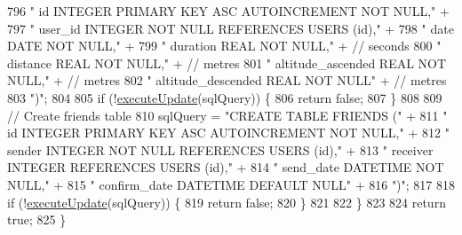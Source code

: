 \begin{DoxyCode}
796                     \textcolor{stringliteral}{"    id                  INTEGER PRIMARY KEY ASC AUTOINCREMENT NOT NULL,"} +
797                     \textcolor{stringliteral}{"    user\_id             INTEGER NOT NULL REFERENCES USERS (id),"} +
798                     \textcolor{stringliteral}{"    date                DATE    NOT NULL,"} +
799                     \textcolor{stringliteral}{"    duration            REAL    NOT NULL,"} + \textcolor{comment}{// seconds}
800                     \textcolor{stringliteral}{"    distance            REAL    NOT NULL,"} + \textcolor{comment}{// metres}
801                     \textcolor{stringliteral}{"    altitude\_ascended   REAL    NOT NULL,"} + \textcolor{comment}{// metres}
802                     \textcolor{stringliteral}{"    altitude\_descended  REAL    NOT NULL"} + \textcolor{comment}{// metres}
803                     \textcolor{stringliteral}{")"};
804 
805             \textcolor{keywordflow}{if} (!\mbox{\hyperlink{classcom_1_1activitytracker_1_1_d_b_manager_a382397e2bdf309901d1c80ff66be69b7}{executeUpdate}}(sqlQuery)) \{
806                 \textcolor{keywordflow}{return} \textcolor{keyword}{false};
807             \}
808 
809             \textcolor{comment}{// Create friends table}
810             sqlQuery = \textcolor{stringliteral}{"CREATE TABLE FRIENDS ("} +
811                     \textcolor{stringliteral}{"    id            INTEGER  PRIMARY KEY ASC AUTOINCREMENT NOT NULL,"} +
812                     \textcolor{stringliteral}{"    sender        INTEGER  NOT NULL REFERENCES USERS (id),"} +
813                     \textcolor{stringliteral}{"    receiver      INTEGER  REFERENCES USERS (id),"} +
814                     \textcolor{stringliteral}{"    send\_date     DATETIME NOT NULL,"} +
815                     \textcolor{stringliteral}{"    confirm\_date  DATETIME DEFAULT NULL"} +
816                     \textcolor{stringliteral}{")"};
817 
818             \textcolor{keywordflow}{if} (!\mbox{\hyperlink{classcom_1_1activitytracker_1_1_d_b_manager_a382397e2bdf309901d1c80ff66be69b7}{executeUpdate}}(sqlQuery)) \{
819                 \textcolor{keywordflow}{return} \textcolor{keyword}{false};
820             \}
821 
822         \}
823 
824         \textcolor{keywordflow}{return} \textcolor{keyword}{true};
825     \}
\end{DoxyCode}
\mbox{\label{classcom_1_1activitytracker_1_1_d_b_manager_af9ab112f840e3c803b6b28a2f1a15215}} 
